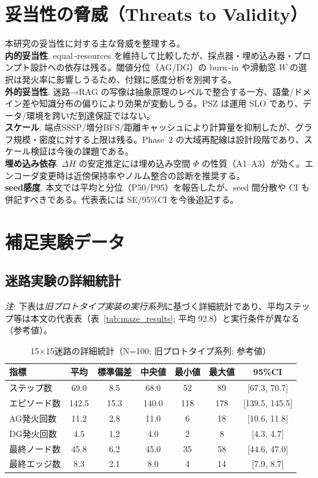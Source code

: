 \documentclass[ja=standard,xelatex]{bxjsarticle}
\begin{document}
\section{妥当性の脅威（Threats to Validity）}
\label{sec:threats}
\noindent 本研究の妥当性に対する主な脅威を整理する。\\
\textbf{内的妥当性}. equal\,\mbox{-}resources を維持して比較したが、採点器・埋め込み器・プロンプト設計への依存は残る。閾値分位（AG/DG）の burn\,\mbox{-}in や滑動窓 $W$ の選択は発火率に影響しうるため、付録に感度分析を別掲する。\\
\textbf{外的妥当性}. 迷路→RAG の写像は抽象原理のレベルで整合する一方、語彙/ドメイン差や知識分布の偏りにより効果が変動しうる。PSZ は運用 SLO であり、データ/環境を跨いだ到達保証ではない。\\
\textbf{スケール}. 端点SSSP/増分BFS/距離キャッシュにより計算量を抑制したが、グラフ規模・密度に対する上限は残る。Phase~2 の大域再配線は設計段階であり、スケール検証は今後の課題である。\\
\textbf{埋め込み依存}. $\Delta H$ の安定推定には埋め込み空間 $\Phi$ の性質（A1--A3）が効く。エンコーダ変更時は近傍保持率やノルム整合の診断を推奨する。\\
\textbf{seed感度}. 本文では平均と分位（P50/P95）を報告したが、seed 間分散や CI も併記すべきである。代表表には SE/95\%CI を今後追記する。




\appendix

\section{補足実験データ}

\subsection{迷路実験の詳細統計}

\noindent\textit{注}: 下表は\emph{旧プロトタイプ実装の実行系列}に基づく詳細統計であり、平均ステップ等は本文の代表表（表~\ref{tab:maze_results}; 平均 92.8）と実行条件が異なる（参考値）。

\begin{table}[H]
\centering
\caption{15×15迷路の詳細統計（N=100; 旧プロトタイプ系列; 参考値）}
\label{tab:maze_detail_15}
\small
\begin{tabular}{lcccccc}
\toprule
指標 & 平均 & 標準偏差 & 中央値 & 最小値 & 最大値 & 95\%CI \\
\midrule
ステップ数 & 69.0 & 8.5 & 68.0 & 52 & 89 & [67.3, 70.7] \\
エピソード数 & 142.5 & 15.3 & 140.0 & 118 & 178 & [139.5, 145.5] \\
AG発火回数 & 11.2 & 2.8 & 11.0 & 6 & 18 & [10.6, 11.8] \\
DG発火回数 & 4.5 & 1.2 & 4.0 & 2 & 8 & [4.3, 4.7] \\
最終ノード数 & 45.8 & 6.2 & 45.0 & 35 & 58 & [44.6, 47.0] \\
最終エッジ数 & 8.3 & 2.1 & 8.0 & 4 & 14 & [7.9, 8.7] \\
\bottomrule
\end{tabular}
\end{table}
\end{document}
